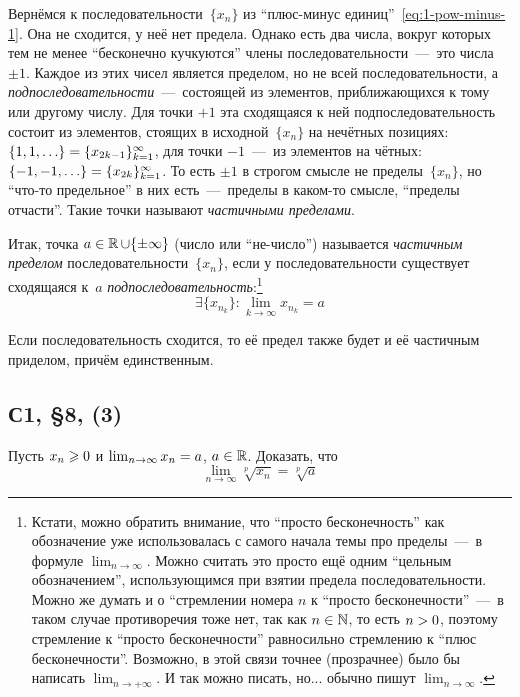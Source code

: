 \documentclass[a4paper,12pt]{article}
\begin{document}
  Вернёмся к последовательности~$\{x_n\}$ из ``плюс-минус единиц''~\eqref{eq:1-pow-minus-1}.
  Она не сходится, у неё нет предела.
  Однако есть два числа, вокруг которых тем не менее ``бесконечно кучкуются'' члены последовательности~---~это числа $\pm 1$.
  Каждое из этих чисел является пределом, но не всей последовательности, а \emph{подпоследовательности}~---~состоящей из элементов, приближающихся к тому или другому числу.
  Для точки ${+1}$ эта сходящаяся к ней подпоследовательность состоит из элементов, стоящих в исходной~$\{x_n\}$ на нечётных позициях: $\{1, 1, \ldots\} \hm= \{x_{2k - 1}\}_{k = 1}^{\infty}$, для точки ${-}1$~---~из элементов на чётных: $\{-1, -1, \ldots\} \hm= \{x_{2k}\}_{k = 1}^{\infty}$.
  То есть $\pm 1$ в строгом смысле не пределы~$\{x_n\}$, но ``что-то предельное'' в них есть~---~пределы в каком-то смысле, ``пределы отчасти''.
  Такие точки называют \emph{частичными пределами}.  %

  Итак, точка $a \hm\in \RR \hm\cup \{\pm \infty\}$ (число или ``не-число'') называется \emph{частичным пределом} последовательности~$\{x_n\}$, если у последовательности существует сходящаяся к~$a$ \emph{подпоследовательность}:\footnote{
    Кстати, можно обратить внимание, что ``просто бесконечность'' как обозначение уже использовалась с самого начала темы про пределы~---~в формуле $\lim_{n \to \infty}$.
    Можно считать это просто ещё одним ``цельным обозначением'', использующимся при взятии предела последовательности.
    Можно же думать и о ``стремлении номера $n$ к ``просто бесконечности''~---~в таком случае противоречия тоже нет, так как $n \hm\in \NN$, то есть $n \hm> 0$, поэтому стремление к ``просто бесконечности'' равносильно стремлению к ``плюс бесконечности''.
    Возможно, в этой связи точнее (прозрачнее) было бы написать $\lim_{n \to +\infty}$.
    И так можно писать, но... обычно пишут $\lim_{n \to \infty}$. 
  }
  \[
    \exists \{x_{n_k}\}\colon \lim_{k \to \infty} x_{n_k} = a
  \]
  
  Если последовательность сходится, то её предел также будет и её частичным приделом, причём единственным.
  
  
  \subsection{С1, \S 8, (3)}
  
  Пусть $x_n \hm\geq 0$ и $\lim_{n \to \infty} x_n \hm= a$, $a \hm\in \RR$.
  Доказать, что
  \[
    \lim_{n \to \infty} \sqrt[p]{x_n} = \sqrt[p]{a}
  \]
  
\end{document}
